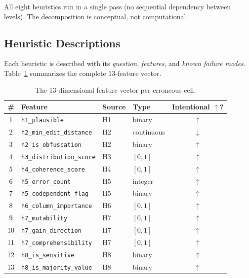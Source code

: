 \documentclass[11pt,a4paper]{article}
\newcommand{\feat}[1]{\texttt{#1}}
\begin{document}
All eight heuristics run in a single pass (no sequential dependency between
levels).  The decomposition is conceptual, not computational.

\subsection{Heuristic Descriptions}
\label{sec:heuristics}

Each heuristic is described with its \emph{question}, \emph{features}, and
\emph{known failure modes}.  Table~\ref{tab:features} summarizes the complete
13-feature vector.

\begin{table}[t]
\centering
\caption{The 13-dimensional feature vector per erroneous cell.}
\label{tab:features}
\small
\begin{tabular}{@{}clllc@{}}
\toprule
\textbf{\#} & \textbf{Feature} & \textbf{Source} & \textbf{Type} & \textbf{Intentional $\uparrow$?} \\
\midrule
1  & \feat{h1\_plausible}           & H1 & binary     & $\uparrow$ \\
2  & \feat{h2\_min\_edit\_distance} & H2 & continuous & $\downarrow$ \\
3  & \feat{h2\_is\_obfuscation}     & H2 & binary     & $\uparrow$ \\
4  & \feat{h3\_distribution\_score} & H3 & $[0,1]$    & $\uparrow$ \\
5  & \feat{h4\_coherence\_score}    & H4 & $[0,1]$    & $\uparrow$ \\
6  & \feat{h5\_error\_count}        & H5 & integer    & $\uparrow$ \\
7  & \feat{h5\_codependent\_flag}   & H5 & binary     & $\uparrow$ \\
8  & \feat{h6\_column\_importance}  & H6 & $[0,1]$    & $\uparrow$ \\
9  & \feat{h7\_mutability}          & H7 & $[0,1]$    & $\uparrow$ \\
10 & \feat{h7\_gain\_direction}     & H7 & $[0,1]$    & $\uparrow$ \\
11 & \feat{h7\_comprehensibility}   & H7 & $[0,1]$    & $\uparrow$ \\
12 & \feat{h8\_is\_sensitive}       & H8 & binary     & $\uparrow$ \\
13 & \feat{h8\_is\_majority\_value} & H8 & binary     & $\uparrow$ \\
\bottomrule
\end{tabular}
\end{table}
\end{document}
